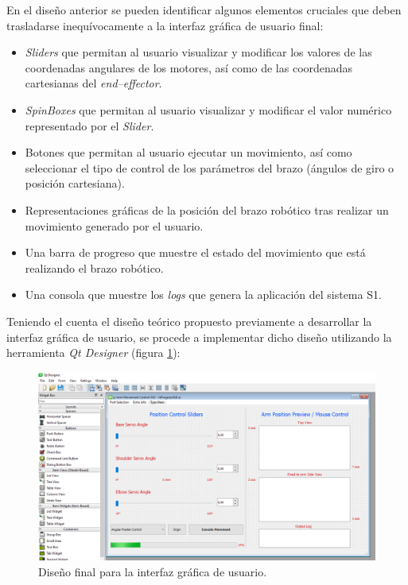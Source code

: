 En el diseño anterior se pueden identificar algunos elementos cruciales que deben trasladarse inequívocamente a la interfaz gráfica de usuario final:
\begin{itemize}
    \item \textit{Sliders} que permitan al usuario visualizar y modificar los valores de las coordenadas angulares de los motores, así como de las coordenadas cartesianas del \textit{end--effector}.
    
    \item \textit{SpinBoxes} que permitan al usuario visualizar y modificar el valor numérico representado por el \textit{Slider}.
    
    \item Botones que permitan al usuario ejecutar un movimiento, así como seleccionar el tipo de control de los parámetros del brazo (ángulos de giro o posición cartesiana).
    
    \item Representaciones gráficas de la posición del brazo robótico tras realizar un movimiento generado por el usuario.
    
    \item Una barra de progreso que muestre el estado del movimiento que está realizando el brazo robótico.
    
    \item Una consola que muestre los \textit{logs} que genera la aplicación del sistema \ac{S1}.
\end{itemize}

Teniendo el cuenta el diseño teórico propuesto previamente a desarrollar la interfaz gráfica de usuario, se procede a implementar dicho diseño utilizando la herramienta \textit{Qt Designer} (figura \ref{fig:ui_QtDesigner}):

\begin{figure}[H]
    \centering
    \includegraphics[width=0.8\linewidth]{pictures/DesignerGui.PNG}
    \caption{Diseño final para la interfaz gráfica de usuario.}
    \label{fig:ui_QtDesigner}
\end{figure}

